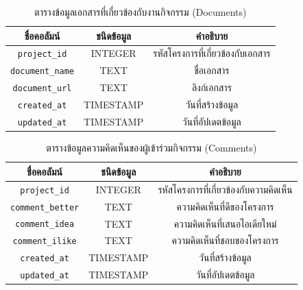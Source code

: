 \begin{table}[hb]
    \centering
    \begin{tabular}{|c|c|c|}
        \hline
        ชื่อคอลัมน์               & ชนิดข้อมูล   & คำอธิบาย                     \\ \hline
        \verb |project_id|    & INTEGER   & รหัสโครงการที่เกี่ยวข้องกับเอกสาร \\ \hline
        \verb |document_name| & TEXT      & ชื่อเอกสาร                   \\ \hline
        \verb |document_url|  & TEXT      & ลิงก์เอกสาร                  \\ \hline
        \verb |created_at|    & TIMESTAMP & วันที่สร้างข้อมูล                \\ \hline
        \verb |updated_at|    & TIMESTAMP & วันที่อัปเดตข้อมูล               \\ \hline
    \end{tabular}
    \caption{ตารางข้อมูลเอกสารที่เกี่ยวข้องกับงานกิจกรรม (Documents)}
    \label{tab:document_data}
\end{table}

\begin{table}[ht]
    \centering
    \begin{tabular}{|c|c|c|}
        \hline
        ชื่อคอลัมน์                & ชนิดข้อมูล   & คำอธิบาย                        \\ \hline
        \verb |project_id|     & INTEGER   & รหัสโครงการที่เกี่ยวข้องกับความคิดเห็น \\ \hline
        \verb |comment_better| & TEXT      & ความคิดเห็นที่ดีของโครงการ         \\ \hline
        \verb |comment_idea|   & TEXT      & ความคิดเห็นที่เสนอไอเดียใหม่        \\ \hline
        \verb |comment_ilike|  & TEXT      & ความคิดเห็นที่ชอบของโครงการ       \\ \hline
        \verb |created_at|     & TIMESTAMP & วันที่สร้างข้อมูล                   \\ \hline
        \verb |updated_at|     & TIMESTAMP & วันที่อัปเดตข้อมูล                  \\ \hline
    \end{tabular}
    \caption{ตารางข้อมูลความคิดเห็นของผู้เข้าร่วมกิจกรรม (Comments)}
    \label{tab:comment_data}
\end{table}

